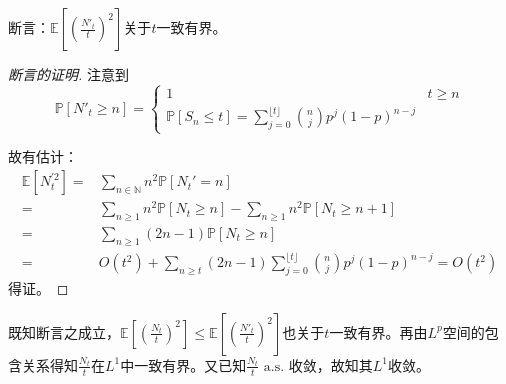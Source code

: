 \documentclass{ctexart}
\begin{document}
断言：$\underset{}{\mathbb{E}}\left[ (\frac{N'_t}{t})^2\right] $关于$t$一致有界。
\begin{proof}[断言的证明]
  注意到
  \begin{equation*}
\mathbb{P}\left[ N'_t \geq n\right]=
\begin{cases}
  1& t\geq n\\ \mathbb{P}\left[ S_n\leq t \right]=\sum\limits_{j=0}^{\lfloor t \rfloor}\binom{n}{j}p^j(1-p)^{n-j}
\end{cases}
  \end{equation*}

  故有估计：  
\begin{align*}
  \underset{}{\mathbb{E}}\left[ N_t^{'2}\right]=& \sum\limits_{n\in \mathbb{N}}^{}n^2 \mathbb{P}\left[ N_t'=n \right]\\
  =& \sum\limits_{n\geq 1}^{} n^2 \mathbb{P}\left[ N_t\geq n \right]- \sum\limits_{n\geq 1}^{}n^2 \mathbb{P}\left[ N_t\geq n+1 \right]\\
  =& \sum\limits_{n\geq 1}^{} (2n-1)\mathbb{P}\left[ N_t\geq n \right]\\
  =& O(t^2) +\sum\limits_{n\geq t}^{}(2n-1)\sum\limits_{j=0}^{\lfloor t \rfloor} \binom{n}{j}p^j(1-p)^{n-j}=O(t^2)
\end{align*}
得证。
\end{proof}

既知断言之成立，$\underset{}{\mathbb{E}}\left[ (\frac{N_t}{t})^2\right]\leq \underset{}{\mathbb{E}}\left[ (\frac{N'_t}{t})^2\right]  $也关于$t$一致有界。再由$L^p$空间的包含关系得知$\frac{N_t}{t}$在$L^1$中一致有界。又已知$\frac{N_t}{t} \text{ a.s. }$收敛，故知其$L^1$收敛。
\end{document}
